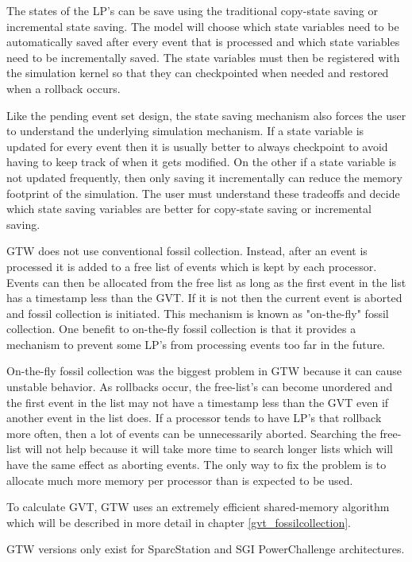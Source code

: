 \documentclass[11pt]{book}
\begin{document}
The states of the LP's can be save using the traditional copy-state saving or incremental state
saving. The model will choose which state variables need to be automatically saved after every event
that is processed and which state variables need to be incrementally saved. The state variables must
then be registered with the simulation kernel so that they can checkpointed when needed and restored
when a rollback occurs.

Like the pending event set design, the state saving mechanism also forces the user to understand
the underlying simulation mechanism. If a state variable is updated for every event then it is
usually better to always checkpoint to avoid having to keep track of when it gets modified. On the
other if a state variable is not updated frequently, then only saving it incrementally can reduce
the memory footprint of the simulation. The user must understand these tradeoffs and decide which
state saving variables are better for copy-state saving or incremental saving.

GTW does not use conventional fossil collection. Instead, after an event is processed it is added to a
free list of events which is kept by each processor. Events can then be allocated from the free list
as long as the first event in the list has a timestamp less than the GVT. If it is not then the
current event is aborted and fossil collection is initiated. This mechanism is known as "on-the-fly"
fossil collection. One benefit to on-the-fly fossil collection is that it provides a mechanism to
prevent some LP's from processing events too far in the future.

On-the-fly fossil collection was the biggest problem in GTW because it can cause unstable behavior.
As rollbacks occur, the free-list's can become unordered and the first event in the list may not
have a timestamp less than the GVT even if another event in the list does. If a processor tends to
have LP's that rollback more often, then a lot of events can be unnecessarily aborted. Searching
the free-list will not help because it will take more time to search longer lists which will have
the same effect as aborting events. The only way to fix the problem is to allocate much more memory
per processor than is expected to be used.

To calculate GVT, GTW uses an extremely efficient shared-memory algorithm which will be described
in more detail in chapter \ref{gvt_fossilcollection}.

GTW versions only exist for SparcStation and SGI PowerChallenge architectures.
\end{document}
